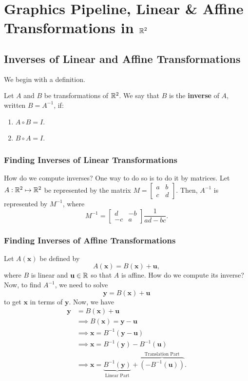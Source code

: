 \documentclass[letterpaper]{article}
\begin{document}

\section{Graphics Pipeline, Linear \& Affine Transformations in \texorpdfstring{$\mathbb{R}^2$}{R2}}

\subsection{Inverses of Linear and Affine Transformations}
We begin with a definition. 
\begin{definition}{}{}
    Let $A$ and $B$ be transformations of $\mathbb{R}^2$. We say that $B$ is the \textbf{inverse} of $A$, written $B = A^{-1}$, if: 
    \begin{enumerate}
        \item $A \circ B = I$. 
        \item $B \circ A = I$. 
    \end{enumerate}
\end{definition}

\subsubsection{Finding Inverses of Linear Transformations}
How do we compute inverses? One way to do so is to do it by matrices. Let $A: \mathbb{R}^2 \mapsto \mathbb{R}^2$ be represented by the matrix $M = \begin{bmatrix}
    a & b \\ c & d
\end{bmatrix}$. Then, $A^{-1}$ is represented by $M^{-1}$, where 
\[M^{-1} = \begin{bmatrix}
    d & -b \\ 
    -c & a
\end{bmatrix} \frac{1}{ad - bc}.\]

\subsubsection{Finding Inverses of Affine Transformations}
Let $A(\mathbf{x})$ be defined by 
\[A(\mathbf{x}) = B(\mathbf{x}) + \mathbf{u},\]
where $B$ is linear and $\mathbf{u} \in \mathbb{R}$ so that $A$ is affine. How do we compute its inverse? Now, to find $A^{-1}$, we need to solve 
\[\mathbf{y} = B(\mathbf{x}) + \mathbf{u}\]
to get $\mathbf{x}$ in terms of $\mathbf{y}$. Now, we have 
\begin{equation*}
    \begin{aligned}
        \mathbf{y} &= B(\mathbf{x}) + \mathbf{u} \\ 
            &\implies B(\mathbf{x}) = \mathbf{y} - \mathbf{u} \\ 
            &\implies \mathbf{x} = B^{-1}(\mathbf{y} - \mathbf{u}) \\ 
            &\implies \mathbf{x} = B^{-1}(\mathbf{y}) - B^{-1}(\mathbf{u}) \\ 
            &\implies \mathbf{x} = \underbrace{B^{-1}(\mathbf{y})}_{\text{Linear Part}} + \overbrace{(-B^{-1}(\mathbf{u}))}^{\text{Translation Part}}.
    \end{aligned}
\end{equation*}
\end{document}
